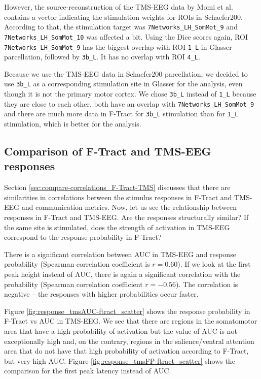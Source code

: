 However, the source-reconstruction of the TMS-EEG data by Momi et al. \cite{momi_tms-evoked_2023} contains a vector indicating the stimulation weights for ROIs in Schaefer200. According to that, the stimulation target was \texttt{7Networks\_LH\_SomMot\_9} and \texttt{7Networks\_LH\_SomMot\_10} was affected a bit. Using the Dice scores again, ROI \texttt{7Networks\_LH\_SomMot\_9} has the biggest overlap with ROI \texttt{1\_L} in Glasser parcellation, followed by \texttt{3b\_L}. It has no overlap with ROI \texttt{4\_L}.

Because we use the TMS-EEG data in Schaefer200 parcellation, we decided to use \texttt{3b\_L} as a corresponding stimulation site in Glasser for the analysis, even though it is not the primary motor cortex. We chose \texttt{3b\_L} instead of \texttt{1\_L} because they are close to each other, both have an overlap with \texttt{7Networks\_LH\_SomMot\_9} and there are much more data in F-Tract for \texttt{3b\_L} stimulation than for \texttt{1\_L} stimulation, which is better for the analysis. 

\subsection{Comparison of F-Tract and TMS-EEG responses}

Section \ref{sec:compare-correlations_F-Tract-TMS} discusses that there are similarities in correlations between the stimulus responses in F-Tract and TMS-EEG and communication metrics. Now, let us see the relationship between responses in F-Tract and TMS-EEG. Are the responses structurally similar? If the same site is stimulated, does the strength of activation in TMS-EEG correspond to the response probability in F-Tract?

There is a significant correlation between AUC in TMS-EEG and response probability (Spearman correlation coefficient is $r=0.60$). If we look at the first peak height instead of AUC, there is again a significant correlation with the probability (Spearman correlation coefficient $r=-0.56$). The correlation is negative -- the responses with higher probabilities occur faster. 

Figure \ref{fig:response_tmsAUC-ftract_scatter} shows the response probability in F-Tract vs AUC in TMS-EEG. We see that there are regions in the somatomotor area that have a high probability of activation but the value of AUC is not exceptionally high and, on the contrary, regions in the salience/ventral attention area that do not have that high probability of activation according to F-Tract, but very high AUC. Figure \ref{fig:response_tmsFP-ftract_scatter} shows the comparison for the first peak latency instead of AUC. 

